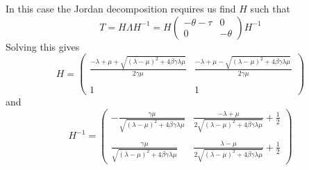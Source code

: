\documentclass[11pt]{article}
\begin{document}
In this case the Jordan decomposition requires us find  $H$ such that
\begin{equation}
\label{ }
T=H\Lambda H^{-1}=H\begin{pmatrix}
  -\theta-\tau    & 0   \\
     0 & -\theta 
\end{pmatrix} H^{-1}
\end{equation}
Solving this gives
\begin{equation}
\label{ }
H=\begin{pmatrix}\displaystyle 
     \frac{-\lambda+\mu+\sqrt{(\lambda-\mu)^2+4\beta \gamma\lambda \mu}}{2 \gamma \mu} & \displaystyle    \frac{-\lambda+\mu-\sqrt{(\lambda-\mu)^2+4\beta \gamma\lambda \mu } \,}{2\gamma \mu} \\ 
& \\     1 & 1 
\end{pmatrix}
\end{equation}
and
\begin{equation}
\label{ }
H^{-1}=\begin{pmatrix}\displaystyle 
     -\frac{\gamma \mu}{\sqrt{(\lambda-\mu)^2+4\beta \gamma\lambda \mu}} & \displaystyle    \frac{-\lambda+\mu }{2 \sqrt{(\lambda-\mu)^2+4\beta \gamma\lambda \mu}}+\frac{1}{2} \\ 
& \\    
 \displaystyle  \frac{\gamma \mu}{\sqrt{(\lambda-\mu)^2+4\beta \gamma\lambda \mu}}  &  \displaystyle \frac{\lambda-\mu }{2 \sqrt{(\lambda-\mu)^2+4\beta \gamma\lambda \mu}}+\frac{1}{2}
\end{pmatrix}
\end{equation}
\end{document}
